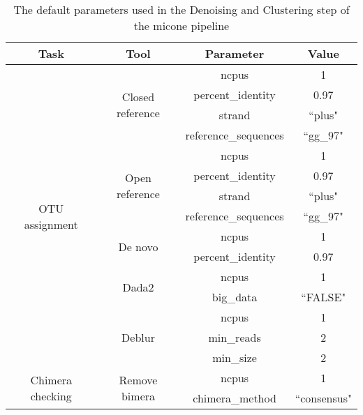 \begin{table}[H]
\centering
\small
\begin{tabular}{|c|c|c|c|}
\hline
\textbf{Task}                     & \textbf{Tool}                     & \textbf{Parameter}   & \textbf{Value}       \\ \hline
\multirow{15}{*}{OTU assignment}  & \multirow{4}{*}{Closed reference} & ncpus                & 1                    \\
                                  &                                   & percent\_identity    & 0.97                 \\
                                  &                                   & strand               & ``plus"               \\
                                  &                                   & reference\_sequences & ``gg\_97" \\ \cline{2-4}
                                  & \multirow{4}{*}{Open reference}   & ncpus                & 1                    \\
                                  &                                   & percent\_identity    & 0.97                 \\
                                  &                                   & strand               & ``plus"               \\
                                  &                                   & reference\_sequences & ``gg\_97" \\ \cline{2-4}
                                  & \multirow{2}{*}{De novo}          & ncpus                & 1                    \\
                                  &                                   & percent\_identity    & 0.97                 \\ \cline{2-4}
                                  & \multirow{2}{*}{Dada2}            & ncpus                & 1                    \\
                                  &                                   & big\_data            & ``FALSE"              \\ \cline{2-4}
                                  & \multirow{3}{*}{Deblur}           & ncpus                & 1                    \\
                                  &                                   & min\_reads           & 2                    \\
                                  &                                   & min\_size            & 2                    \\ \hline
\multirow{2}{*}{Chimera checking} & \multirow{2}{*}{Remove bimera}    & ncpus                & 1                    \\
                                  &                                   & chimera\_method      & ``consensus"          \\ \hline
\end{tabular}
\caption{The default parameters used in the Denoising and Clustering step of the \ac{micone} pipeline}
\label{tab:dc_parameters}
\end{table}

